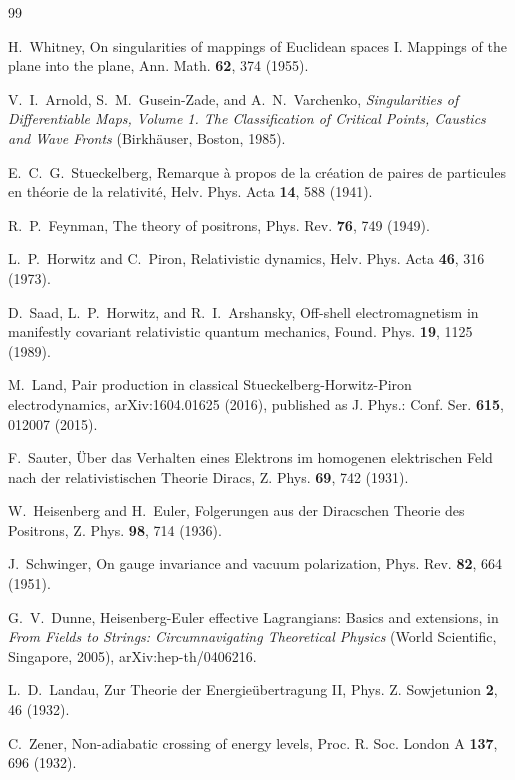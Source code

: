 \documentclass[aps,pre,reprint,nofootinbib,floatfix]{revtex4-2}
\begin{document}
\begin{thebibliography}{99}

H.~Whitney,
On singularities of mappings of Euclidean spaces I. Mappings of the
plane into the plane,
Ann. Math. \textbf{62}, 374 (1955).

V.~I.~Arnold, S.~M.~Gusein-Zade, and A.~N.~Varchenko,
\emph{Singularities of Differentiable Maps, Volume 1. The
Classification of Critical Points, Caustics and Wave Fronts}
(Birkh\"auser, Boston, 1985).

E.~C.~G.~Stueckelberg,
Remarque \`a propos de la cr\'eation de paires de particules en
th\'eorie de la relativit\'e,
Helv. Phys. Acta \textbf{14}, 588 (1941).

R.~P.~Feynman,
The theory of positrons,
Phys. Rev. \textbf{76}, 749 (1949).

L.~P.~Horwitz and C.~Piron,
Relativistic dynamics,
Helv. Phys. Acta \textbf{46}, 316 (1973).

D.~Saad, L.~P.~Horwitz, and R.~I.~Arshansky,
Off-shell electromagnetism in manifestly covariant relativistic quantum
mechanics,
Found. Phys. \textbf{19}, 1125 (1989).

M.~Land,
Pair production in classical Stueckelberg-Horwitz-Piron
electrodynamics,
arXiv:1604.01625 (2016),
published as J. Phys.: Conf. Ser. \textbf{615}, 012007 (2015).

F.~Sauter,
\"Uber das Verhalten eines Elektrons im homogenen elektrischen Feld
nach der relativistischen Theorie Diracs,
Z. Phys. \textbf{69}, 742 (1931).

W.~Heisenberg and H.~Euler,
Folgerungen aus der Diracschen Theorie des Positrons,
Z. Phys. \textbf{98}, 714 (1936).

J.~Schwinger,
On gauge invariance and vacuum polarization,
Phys. Rev. \textbf{82}, 664 (1951).

G.~V.~Dunne,
Heisenberg-Euler effective Lagrangians: Basics and extensions,
in \emph{From Fields to Strings: Circumnavigating Theoretical Physics}
(World Scientific, Singapore, 2005),
arXiv:hep-th/0406216.

L.~D.~Landau,
Zur Theorie der Energie\"ubertragung II,
Phys. Z. Sowjetunion \textbf{2}, 46 (1932).

C.~Zener,
Non-adiabatic crossing of energy levels,
Proc. R. Soc. London A \textbf{137}, 696 (1932).


\end{thebibliography}
\end{document}

